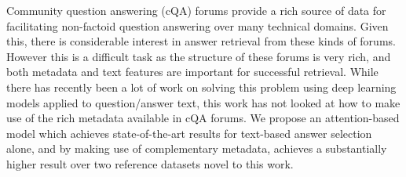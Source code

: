 Community question answering (cQA) forums provide a rich source of data for facilitating non-factoid question answering over many technical domains.  Given this, there is considerable interest in answer retrieval from these kinds of forums. However this is a difficult task as the structure of these forums is very rich, and both metadata and text features are important for successful retrieval. While there has recently been a lot of work on solving this problem using deep learning models applied to question/answer text, this work has not looked at how to make use of the rich metadata available in cQA forums. We propose an attention-based model which achieves state-of-the-art results for text-based answer selection alone, and by making use of complementary metadata, achieves a substantially higher result over two reference datasets novel to this work.
